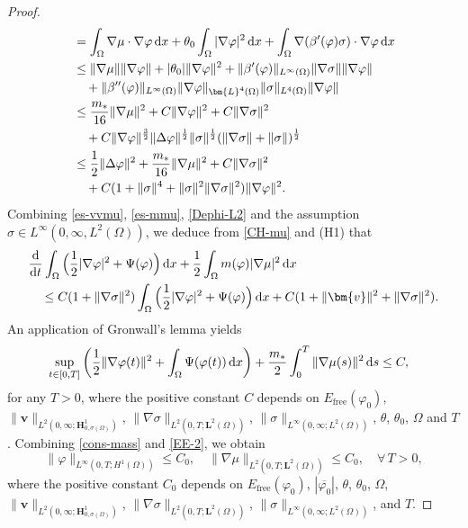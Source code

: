 \documentclass[11pt,reqno]{amsart}
\def\d{{\rm d}}
\def\ddt{\frac{\d}{\d t}}
\def\vv{\bm{v}}
\begin{document}
\begin{proof}
\begin{align}
& = \int_{\Omega} \nabla \mu \cdot \nabla \varphi \, \d x
+ \theta_0 \int_{\Omega}  |\nabla \varphi|^2 \, \d x
+  \int_\Omega \nabla (\beta'(\varphi)\sigma) \cdot \nabla \varphi \, \d x
\notag \\
&\leq \|\nabla \mu\|\|\nabla \varphi\|+ |\theta_0| \|\nabla \varphi\|^2
+ \|\beta'(\varphi)\|_{L^\infty(\Omega)}\|\nabla \sigma\|\|\nabla \varphi\|
\notag\\
&\quad + \|\beta''(\varphi)\|_{L^\infty(\Omega)}\|\nabla \varphi\|_{\bm{L}^4(\Omega)}\|\sigma\|_{L^4(\Omega)}\|\nabla \varphi\|
\notag\\
&\leq \frac{m_*}{16} \|\nabla \mu\|^2+ C\|\nabla \varphi\|^2+ C\|\nabla \sigma\|^2
\notag\\
&\quad + C\|\nabla \varphi\|^\frac32 \|\Delta \varphi\|^\frac12
\|\sigma\|^\frac12 (\|\nabla \sigma\|+\|\sigma\|)^\frac12
\notag\\
&\leq \frac12\|\Delta\varphi\|^2+ \frac{m_*}{16}\|\nabla \mu\|^2+ C\|\nabla \sigma\|^2\notag\\
&\quad + C(1+\|\sigma\|^4 +  \|\sigma\|^2\|\nabla \sigma\|^2)\|\nabla \varphi\|^2.
\label{Dephi-L2}
\end{align}
%
Combining \eqref{es-vvmu}, \eqref{es-mmu}, \eqref{Dephi-L2} and the assumption $\sigma \in L^\infty(0,\infty,L^2(\Omega))$, we deduce from \eqref{CH-mu} and (H1) that
%
\begin{align}
&\ddt   \int_{\Omega} \Big( \frac12 |\nabla \varphi|^2 + \Psi(\varphi)\Big) \, \d x
+ \frac12 \int_{\Omega}  m(\varphi) |\nabla \mu|^2 \, \d x
\notag\\
&\quad \leq  C(1+\|\nabla \sigma\|^2)  \int_{\Omega} \Big( \frac12 |\nabla \varphi|^2 + \Psi(\varphi)\Big) \, \d x  + C(1+ \| \vv\|^2 + \| \nabla \sigma\|^2).
\label{EE-CH}
\end{align}
%
An application of Gronwall's lemma yields
%
\begin{equation}
\label{EE-2}
\begin{split}
&\sup_{t \in [0,T]} \left(\frac12 \|\nabla \varphi(t)\|^2+\int_\Omega\Psi(\varphi(t))\,\mathrm{d}x\right)
+ \frac{m_*}{2}\int_0^T \|\nabla \mu(s)\|^2 \, \d s
 \leq C,
\end{split}
\end{equation}
%
for any $T>0$, where the positive constant $C$ depends on $E_{\text{free}}(\varphi_0)$, $\| \vv\|_{L^2(0,\infty;\bm{H}^1_{0,\sigma(\Omega)})}$,
$\| \nabla \sigma \|_{L^2(0,T;\bm{L}^2(\Omega))}$, $\|  \sigma \|_{L^\infty(0,\infty;L^2(\Omega))}$, $\theta$, $\theta_0$, $\Omega$ and $T$. Combining \eqref{cons-mass} and \eqref{EE-2}, we obtain
%
\begin{equation}
\label{EE-3}
\| \varphi \|_{L^\infty(0,T;H^1(\Omega))}\leq C_0, \quad
\| \nabla \mu\|_{L^2(0,T;\bm{L}^2(\Omega))}\leq C_0, \quad \forall \, T>0,
\end{equation}
%
where the positive constant $C_0$ depends on $E_{\text{free}}(\varphi_0)$, $|\overline{\varphi_0}|$, $\theta$, $\theta_0$, $\Omega $, $\| \vv\|_{L^2(0,\infty;\bm{H}^1_{0,\sigma(\Omega)})}$,
$\| \nabla \sigma \|_{L^2(0,T;\bm{L}^2(\Omega))}$, $\|  \sigma \|_{L^\infty(0,\infty;L^2(\Omega))}$, and $T$.


\end{proof}
\end{document}
